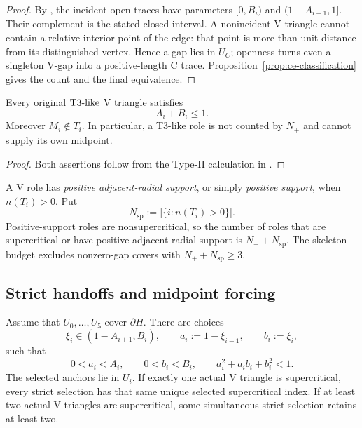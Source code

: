 \begin{proof}
By , the incident open traces have
parameters $[0,B_i)$ and $(1-A_{i+1},1]$. Their complement is the stated
closed interval.
A nonincident V triangle cannot contain a relative-interior point of the edge:
that point is more than unit distance from its distinguished vertex.  Hence a
gap lies in $U_C$; openness turns even a singleton V-gap into a
positive-length C trace.  Proposition~\ref{prop:ce-classification} gives the
count and the final equivalence.
\end{proof}



\begin{lemma}
\label{lem:t3-nonsupercritical}
Every original $\mathrm{T3\text{-}like}$ V triangle satisfies
\begin{equation}
 A_i+B_i\le1.
 \label{eq:t3-nonsupercritical}
\end{equation}
Moreover $M_i\notin T_i$. In particular, a T3-like role is not counted
by $N_+$ and cannot supply its own midpoint.
\end{lemma}

\begin{proof}
Both assertions follow from the Type-II calculation in
.
\end{proof}

A V role has \emph{positive adjacent-radial support}, or simply
\emph{positive support}, when $n(T_i)>0$. Put
\[
 N_{\mathrm{sp}}:=|\{i:n(T_i)>0\}|.
\]
Positive-support roles are nonsupercritical, so the number of roles that
are supercritical or have positive adjacent-radial support is
$N_++N_{\mathrm{sp}}$. The skeleton budget excludes nonzero-gap covers
with $N_++N_{\mathrm{sp}}\ge3$.



\subsection{Strict handoffs and midpoint forcing}

\begin{proposition}
\label{prop:strict-handoffs}
Assume that $U_0,\ldots,U_5$ cover $\partial H$.  There are choices
\[
 \xi_i\in(1-A_{i+1},B_i),\qquad
 a_i:=1-\xi_{i-1},\qquad b_i:=\xi_i,
\]
such that
\[
 0<a_i<A_i,\qquad0<b_i<B_i,\qquad
 a_i^2+a_ib_i+b_i^2<1.
\]
The selected anchors lie in $U_i$.  If exactly one actual V triangle is
supercritical, every strict selection has that same unique selected
supercritical index.  If at least two actual V triangles are supercritical,
some simultaneous strict selection retains at least two.
\end{proposition}

